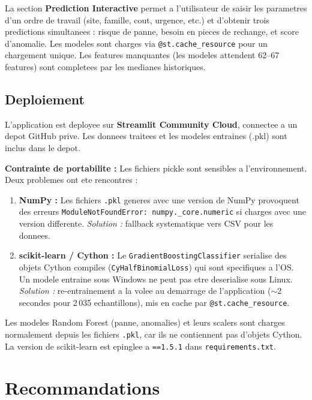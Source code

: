 \documentclass[12pt,a4paper]{article}
\begin{document}
La section \textbf{Prediction Interactive} permet a l'utilisateur de saisir les parametres d'un ordre de travail (site, famille, cout, urgence, etc.) et d'obtenir trois predictions simultanees : risque de panne, besoin en pieces de rechange, et score d'anomalie. Les modeles sont charges via \texttt{@st.cache\_resource} pour un chargement unique. Les features manquantes (les modeles attendent 62--67 features) sont completees par les medianes historiques.

\subsection{Deploiement}

L'application est deployee sur \textbf{Streamlit Community Cloud}, connectee a un depot GitHub prive. Les donnees traitees et les modeles entraines (.pkl) sont inclus dans le depot.

\textbf{Contrainte de portabilite :} Les fichiers pickle sont sensibles a l'environnement. Deux problemes ont ete rencontres :

\begin{enumerate}
  \item \textbf{NumPy :} Les fichiers \texttt{.pkl} generes avec une version de NumPy provoquent des erreurs \texttt{ModuleNotFoundError: numpy.\_core.numeric} si charges avec une version differente. \textit{Solution :} fallback systematique vers CSV pour les donnees.
  \item \textbf{scikit-learn / Cython :} Le \texttt{GradientBoostingClassifier} serialise des objets Cython compiles (\texttt{CyHalfBinomialLoss}) qui sont specifiques a l'OS. Un modele entraine sous Windows ne peut pas etre deserialise sous Linux. \textit{Solution :} re-entrainement a la volee au demarrage de l'application ($\sim$2 secondes pour 2\,035 echantillons), mis en cache par \texttt{@st.cache\_resource}.
\end{enumerate}

Les modeles Random Forest (panne, anomalies) et leurs scalers sont charges normalement depuis les fichiers \texttt{.pkl}, car ils ne contiennent pas d'objets Cython. La version de scikit-learn est epinglee a \texttt{==1.5.1} dans \texttt{requirements.txt}.

\section{Recommandations}
\end{document}
